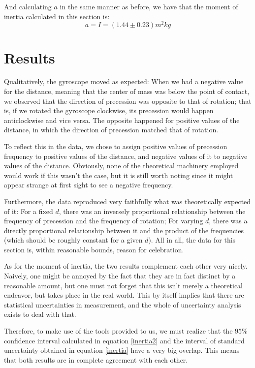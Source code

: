 \documentclass[a4paper,12pt]{article}
\begin{document}
And calculating $a$ in the same manner as before, we have that the moment of inertia calculated in this section is:
\begin{equation}
\label{inertia}
	a = I = \left(1.44 \pm 0.23\right) m^2 kg
\end{equation}


\section{Results}

Qualitatively, the gyroscope moved as expected: When we had a negative value for the distance, meaning that the center of mass was below the point of contact, we observed that the direction of precession was opposite to that of rotation; that is, if we rotated the gyroscope clockwise, its precession would happen anticlockwise and vice versa. The opposite happened for positive values of the distance, in which the direction of precession matched that of rotation.

To reflect this in the data, we chose to assign positive values of precession frequency to positive values of the distance, and negative values of it to negative values of the distance. Obviously, none of the theoretical machinery employed would work if this wasn't the case, but it is still worth noting since it might appear strange at first sight to see a negative frequency.

Furthermore, the data reproduced very faithfully what was theoretically expected of it: For a fixed $d$, there was an inversely proportional relationship between the frequency of precession and the frequency of rotation; For varying $d$, there was a directly proportional relationship between it and the product of the frequencies (which should be roughly constant for a given $d$). All in all, the data for this section is, within reasonable bounds, reason for celebration.

As for the moment of inertia, the two results complement each other very nicely. Naively, one might be annoyed by the fact that they are in fact distinct by a reasonable amount, but one must not forget that this isn't merely a theoretical endeavor, but takes place in the real world. This by itself implies that there are statistical uncertainties in measurement, and the whole of uncertainty analysis exists to deal with that.

Therefore, to make use of the tools provided to us, we must realize that the $95\%$ confidence interval calculated in equation \eqref{inertia2} and the interval of standard uncertainty obtained in equation \eqref{inertia} have a very big overlap. This means that both results are in complete agreement with each other. 
\end{document}
